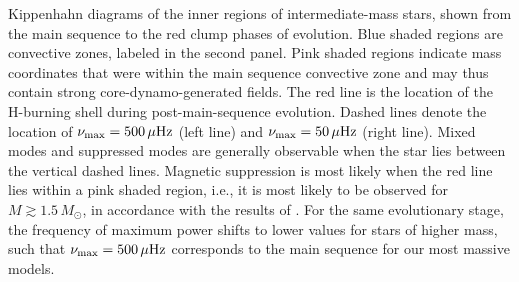 \label{fig:DipoleHist}
Kippenhahn diagrams of the inner regions of intermediate-mass stars, shown from the main sequence to the red clump phases of evolution. Blue shaded regions are convective zones, labeled in the second panel. Pink shaded regions indicate mass coordinates that were within the main sequence convective zone and may thus contain strong core-dynamo-generated fields. The red line is the location of the H-burning shell during post-main-sequence evolution. Dashed lines denote the location of $\nu_{\rm max} = 500 \, \mu{\rm Hz}$ (left line) and $\nu_{\rm max} = 50 \, \mu{\rm Hz}$ (right line). Mixed modes and suppressed modes are generally observable when the star lies between the vertical dashed lines. Magnetic suppression is most likely when the red line lies within a pink shaded region, i.e., it is most likely to be observed for $M \gtrsim 1.5 \, M_\odot$, in accordance with the results of \cite{Stello_2016}. For the same evolutionary stage, the frequency of maximum power shifts to lower values for stars of higher mass, such that $\nu_{\rm max} = 500 \, \mu{\rm Hz}$ corresponds to the main sequence for our most massive models.
  